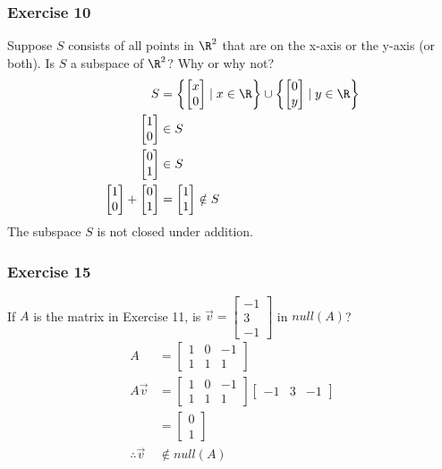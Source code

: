 \documentclass{math}
\begin{document}
\subsubsection*{Exercise 10}
Suppose \( S \) consists of all points in \( \R^2 \) that are on the x-axis or
the y-axis (or both). Is \( S \) a subspace of \( \R^2 \)? Why or why not?
\begin{align*}
  S &= \left\{\begin{bmatrix}x \\ 0\end{bmatrix}\mid x\in\R\right\}\cup
  \left\{\begin{bmatrix}0 \\ y\end{bmatrix}\mid y\in\R\right\} \\
  \begin{bmatrix}1 \\ 0\end{bmatrix} &\in S \\
  \begin{bmatrix}0 \\ 1\end{bmatrix} &\in S \\
  \begin{bmatrix}1 \\ 0\end{bmatrix}+\begin{bmatrix}0 \\ 1\end{bmatrix} &=
    \begin{bmatrix}1 \\ 1\end{bmatrix}\notin S
\end{align*}
The subspace \( S \) is not closed under addition.

\subsubsection*{Exercise 15}
If \( A \) is the matrix in Exercise 11, is \( \vec{v} = \begin{bmatrix}
-1 \\ 3 \\ -1\end{bmatrix} \) in \( null(A) \)?
\begin{align*}
  A &= \begin{bmatrix}
    1 & 0 & -1 \\
    1 & 1 & 1
  \end{bmatrix} \\
  A\vec{v} &= \begin{bmatrix}
    1 & 0 & -1 \\
    1 & 1 & 1
  \end{bmatrix}\begin{bmatrix}-1 & 3 & -1\end{bmatrix} \\
  &= \begin{bmatrix}0 \\ 1\end{bmatrix} \\
  \therefore \vec{v} &\notin null(A)
\end{align*}
\end{document}
